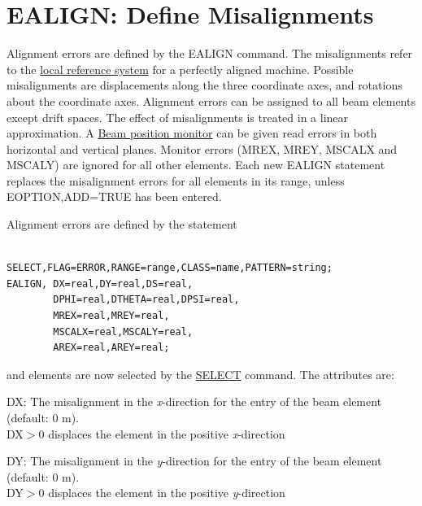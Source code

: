 








\section{EALIGN: Define Misalignments}  Alignment errors are defined by the EALIGN command. The misalignments refer to the \href{../Introduction/local_system.html}{local reference system} for a perfectly aligned machine. Possible misalignments are displacements along the three coordinate axes, and rotations about the coordinate axes. Alignment errors can be assigned to all beam elements except drift spaces. The effect of misalignments is treated in a linear approximation. A \href{read HREF=../Introduction/monitors.html}{Beam position monitor} can be given read errors in both horizontal and vertical planes. Monitor errors (MREX, MREY, MSCALX and MSCALY) are ignored for all other elements. Each new EALIGN statement replaces the misalignment errors for all elements in its range, unless EOPTION,ADD=TRUE has been entered. 

 Alignment errors are defined by the statement 
\begin{verbatim}

SELECT,FLAG=ERROR,RANGE=range,CLASS=name,PATTERN=string;
EALIGN, DX=real,DY=real,DS=real, 
        DPHI=real,DTHETA=real,DPSI=real, 
        MREX=real,MREY=real,
        MSCALX=real,MSCALY=real,
        AREX=real,AREY=real;
\end{verbatim} and elements are now selected by the \href{../Introduction/select.html}{SELECT} command. The attributes are: 

DX: The misalignment in the \textit{x}-direction for the entry of the beam element (default: 0 m). 
\\ DX$>$0 displaces the element in the positive \textit{x}-direction 

DY: The misalignment in the \textit{y}-direction for the entry of the beam element (default: 0 m). 
\\ DY$>$0 displaces the element in the positive \textit{y}-direction 

